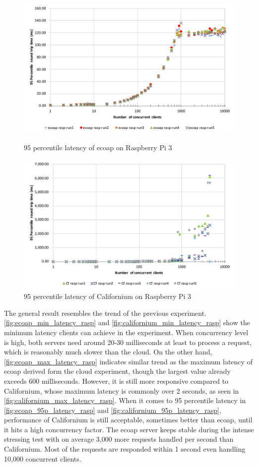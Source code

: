 \begin{figure}[!htbp]
\centering
\includegraphics[scale = 0.7]{ecoap_95p_latency_rasp}
\caption{95 percentile latency of ecoap on Raspberry Pi 3}
\label{fig:ecoap_95p_latency_rasp}
\includegraphics[scale = 0.7]{californium_95p_latency_rasp}
\caption{95 percentile latency of Californium on Raspberry Pi 3}
\label{fig:californium_95p_latency_rasp}
\end{figure}

The general result resembles the trend of the previous experiment. \autoref{fig:ecoap_min_latency_rasp} and \autoref{fig:californium_min_latency_rasp} show the minimum latency clients can achieve in the experiment. When concurrency level is high, both servers need around 20-30 milliseconds at least to process a request, which is reasonably much slower than the cloud.
On the other hand, \autoref{fig:ecoap_max_latency_rasp} indicates similar trend as the maximum latency of ecoap derived form the cloud experiment, though the largest value already exceeds 600 milliseconds. However, it is still more responsive compared to Californium, whose maximum latency is commonly over 2 seconds, as seen in \autoref{fig:californium_max_latency_rasp}. When it comes to 95 percentile latency in \autoref{fig:ecoap_95p_latency_rasp} and \autoref{fig:californium_95p_latency_rasp}, performance of Californium is still acceptable, sometimes better than ecoap, until it hits a high concurrency factor. The ecoap server keeps stable during the intense stressing test with on average 3,000 more requests handled per second than Californium. Most of the requests are responded within 1 second even handling 10,000 concurrent clients.

